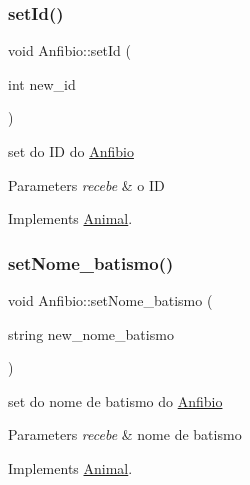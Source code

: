 \subsubsection{\texorpdfstring{setId()}{setId()}}
{\footnotesize\ttfamily void Anfibio\+::set\+Id (\begin{DoxyParamCaption}\item[{int}]{new\+\_\+id }\end{DoxyParamCaption})\hspace{0.3cm}{\ttfamily [virtual]}}



set do ID do \mbox{\hyperlink{class_anfibio}{Anfibio}} 


\begin{DoxyParams}{Parameters}
{\em recebe} & o ID \\
\hline
\end{DoxyParams}


Implements \mbox{\hyperlink{class_animal}{Animal}}.

\mbox{\label{class_anfibio_a7a547d2737f260126110667e2885572f}} 
\subsubsection{\texorpdfstring{setNome\_batismo()}{setNome\_batismo()}}
{\footnotesize\ttfamily void Anfibio\+::set\+Nome\+\_\+batismo (\begin{DoxyParamCaption}\item[{string}]{new\+\_\+nome\+\_\+batismo }\end{DoxyParamCaption})\hspace{0.3cm}{\ttfamily [virtual]}}



set do nome de batismo do \mbox{\hyperlink{class_anfibio}{Anfibio}} 


\begin{DoxyParams}{Parameters}
{\em recebe} & nome de batismo \\
\hline
\end{DoxyParams}


Implements \mbox{\hyperlink{class_animal}{Animal}}.

\mbox{\label{class_anfibio_aa9eeaec2d983364de0976647918dea21}} 
